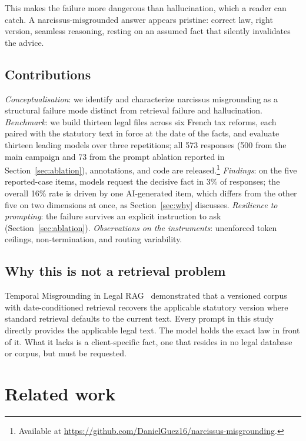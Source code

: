\documentclass{IOS-Book-Article}
\begin{document}
This makes the failure more dangerous than hallucination, which a reader can catch. A narcissus-misgrounded answer appears pristine: correct law, right version, seamless reasoning, resting on an assumed fact that silently invalidates the advice.

\subsection*{Contributions}

\emph{Conceptualisation}: we identify and characterize narcissus misgrounding as a structural failure mode distinct from retrieval failure and hallucination. \emph{Benchmark}: we build thirteen legal files across six French tax reforms, each paired with the statutory text in force at the date of the facts, and evaluate thirteen leading models over three repetitions; all 573 responses (500 from the main campaign and 73 from the prompt ablation reported in Section~\ref{sec:ablation}), annotations, and code are released.\footnote{Available at \url{https://github.com/DanielGuez16/narcissus-misgrounding}.} \emph{Findings}: on the five reported-case items, models request the decisive fact in 3\% of responses; the overall 16\% rate is driven by one AI-generated item, which differs from the other five on two dimensions at once, as Section~\ref{sec:why} discusses. \emph{Resilience to prompting}: the failure survives an explicit instruction to ask (Section~\ref{sec:ablation}). \emph{Observations on the instruments}: unenforced token ceilings, non-termination, and routing variability.

\subsection*{Why this is not a retrieval problem}

Temporal Misgrounding in Legal RAG~\cite{cymbler2026} demonstrated that a versioned corpus with date-conditioned retrieval recovers the applicable statutory version where standard retrieval defaults to the current text. Every prompt in this study directly provides the applicable legal text. The model holds the exact law in front of it. What it lacks is a client-specific fact, one that resides in no legal database or corpus, but must be requested.

\section{Related work}
\end{document}
